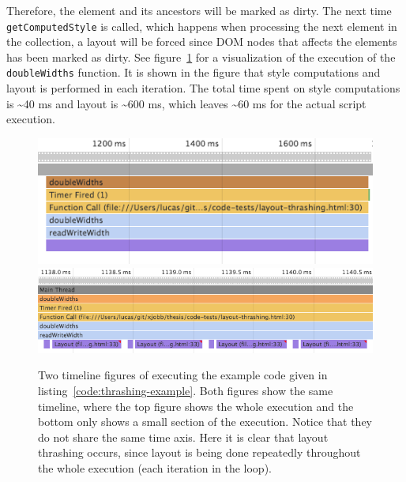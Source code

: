 \documentclass[a4paper,11pt]{kth-mag}
\newcommand{\code}[1]{\texttt{#1}}
\begin{document}
        Therefore, the element and its ancestors will be marked as dirty.
        The next time \code{getComputedStyle} is called, which happens when processing the next element in the collection, a layout will be forced since \gls{DOM} nodes that affects the \glspl{element} has been marked as dirty.
        See figure~\ref{fig:layout-thrashing-example-1} for a visualization of the execution of the \code{doubleWidths} function.
        It is shown in the figure that style computations and layout is performed in each iteration.
        The total time spent on style computations is \textasciitilde40 ms and layout is \textasciitilde600 ms, which leaves \textasciitilde60 ms for the actual script execution.

        \begin{figure}[ht]
          \centering
          \includegraphics[scale=0.7]{images/layout-thrashing-example-1-big}
          \includegraphics[scale=0.6]{images/layout-thrashing-example-1}
          \caption{Two timeline figures of executing the example code given in listing~\ref{code:thrashing-example}. Both figures show the same timeline, where the top figure shows the whole execution and the bottom only shows a small section of the execution. Notice that they do not share the same time axis. Here it is clear that \gls{layout thrashing} occurs, since layout is being done repeatedly throughout the whole execution (each iteration in the loop).}
          \label{fig:layout-thrashing-example-1}
        \end{figure}
        
\end{document}
